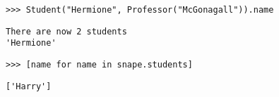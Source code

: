 \begin{lstlisting}
>>> Student("Hermione", Professor("McGonagall")).name
\end{lstlisting}
\begin{solution}[.5in]
\begin{lstlisting}
There are now 2 students
'Hermione'
\end{lstlisting}
\end{solution}

\begin{lstlisting}
>>> [name for name in snape.students]
\end{lstlisting}
\begin{solution}[.5in]
\begin{lstlisting}
['Harry']
\end{lstlisting}
\end{solution}
